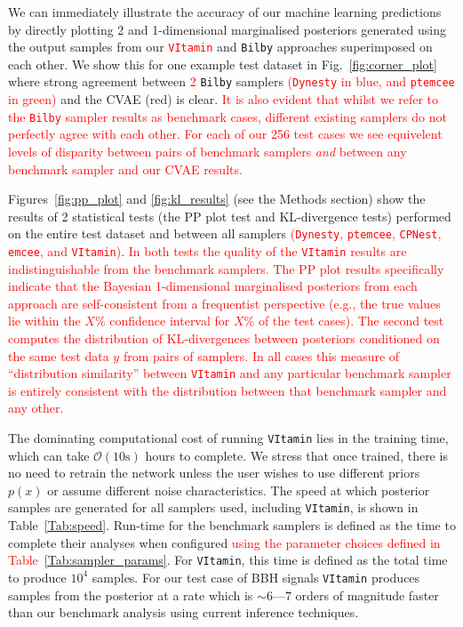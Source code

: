 \documentclass[%
showpacs,
nofootinbib,
 amsmath,amssymb,
 aps,
 twocolumn,
 prl,
 reprint,
floatfix,
]{revtex4-1}
\newcommand{\new}[1]{\textcolor{red}{#1}}
\begin{document}
%
%
We can immediately illustrate the accuracy of our machine learning predictions
by directly plotting 2 and 1-dimensional marginalised posteriors generated
using the output samples from our \new{\texttt{VItamin}} and \texttt{Bilby}
approaches superimposed on each other. We show this for one example test
dataset in Fig.~\ref{fig:corner_plot} where strong agreement between \new{2}
\texttt{Bilby} samplers \new{(\texttt{Dynesty} in blue, and \texttt{ptemcee} in green)} and the
\ac{CVAE} (red) is clear. \new{It is also evident that whilst we refer to the
\texttt{Bilby} sampler results as benchmark cases, different existing samplers
do not perfectly agree with each other. For each of our 256 test cases we see
equivelent levels of disparity between pairs of benchmark samplers \emph{and}
between any benchmark sampler and our \ac{CVAE} results.}  

%
%
Figures~\ref{fig:pp_plot} and \ref{fig:kl_results} (see the Methods section)
show the results of 2 statistical tests (the \ac{PP} plot test and
\ac{KL}-divergence tests) performed on the entire test dataset and between all
samplers \new{(\texttt{Dynesty}, \texttt{ptemcee}, \texttt{CPNest}, \texttt{emcee}, and \texttt{VItamin})}. \new{In
both tests the quality of the \new{\texttt{VItamin}} results are indistinguishable from the
benchmark samplers. The \ac{PP} plot results specifically indicate that the
Bayesian 1-dimensional marginalised posteriors from each approach are
self-consistent from a frequentist perspective (e.g., the true values lie
within the $X\%$ confidence interval for $X\%$ of the test cases). The second
test computes the distribution of \ac{KL}-divergences between posteriors
conditioned on the same test data $y$ from pairs of samplers. In all cases this
measure of ``distribution similarity'' between \texttt{VItamin} and any particular
benchmark sampler is entirely consistent with the distribution between that
benchmark sampler and any other.}   

%
%
The dominating computational cost of running \texttt{VItamin} lies in the
training time, which can take $\mathcal{O}(10\text{s})$ hours to complete. We
stress that once trained, there is no need to retrain the network unless the
user wishes to use different priors $p(x)$ or assume different noise
characteristics. The speed at which posterior samples are generated for all
samplers used, including \texttt{VItamin}, is shown in Table~\ref{Tab:speed}.
Run-time for the benchmark samplers is defined as the time to complete their
analyses when configured \new{using the parameter choices defined in
Table~\ref{Tab:sampler_params}}. For \texttt{VItamin}, this time is defined as
the total time to produce $10^4$ samples. For our test case of \ac{BBH} signals
\texttt{VItamin} produces samples from the posterior at a rate which is $\sim
6$---$7$ orders of magnitude faster than our benchmark analysis using current
inference techniques. 
\end{document}
